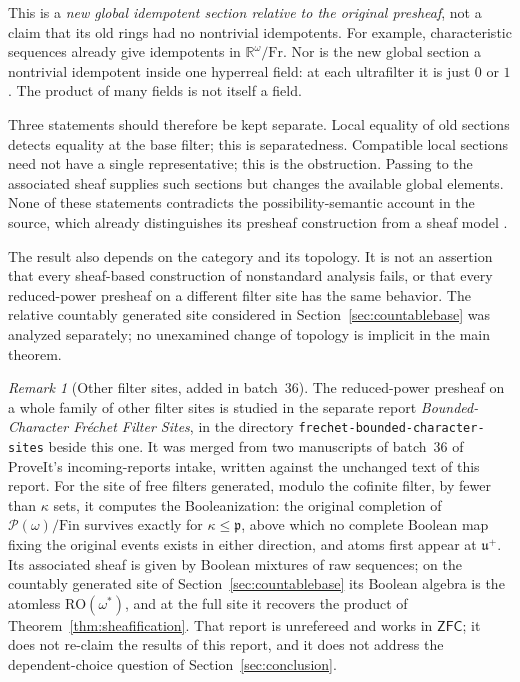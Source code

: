 \documentclass[11pt,letterpaper]{article}
\theoremstyle{definition}
\theoremstyle{remark}
\newtheorem{remark}[theorem]{Remark}
\newcommand{\om}{\omega}
\newcommand{\Fr}{\mathrm{Fr}}
\newcommand{\Pow}{\mathcal P}
\newcommand{\ZFC}{\mathsf{ZFC}}
\begin{document}
This is a \emph{new global idempotent section relative to the original
presheaf}, not a claim that its old rings had no nontrivial idempotents.
For example, characteristic sequences already give idempotents in
$\mathbb R^\om/\Fr$. Nor is the new global section a nontrivial
idempotent inside one hyperreal field: at each ultrafilter it is just
$0$ or $1$. The product of many fields is not itself a field.

Three statements should therefore be kept separate. Local equality of
old sections detects equality at the base filter; this is separatedness.
Compatible local sections need not have a single representative; this
is the obstruction. Passing to the associated sheaf supplies such
sections but changes the available global elements. None of these
statements contradicts the possibility-semantic account in the source,
which already distinguishes its presheaf construction from a sheaf
model \cite[Section 5.2]{Massas2023}.

The result also depends on the category and its topology. It is not an
assertion that every sheaf-based construction of nonstandard analysis
fails, or that every reduced-power presheaf on a different filter site
has the same behavior. The relative countably generated site considered
in Section~\ref{sec:countablebase} was analyzed separately; no
unexamined change of topology is implicit in the main theorem.

\begin{remark}[Other filter sites, added in batch~36]
\label{fto:rem:bounded-character-sites}
The reduced-power presheaf on a whole family of other filter sites is
studied in the separate report \emph{Bounded-Character Fr\'echet Filter
Sites}, in the directory \texttt{frechet-bounded-character-sites} beside
this one. It was merged from two manuscripts of batch~36 of ProveIt's
incoming-reports intake, written against the unchanged text of this
report. For the site of free filters generated, modulo the cofinite
filter, by fewer than $\kappa$ sets, it computes the Booleanization: the
original completion of $\Pow(\om)/\mathrm{Fin}$ survives exactly for
$\kappa\leq\mathfrak p$, above which no complete Boolean map fixing the
original events exists in either direction, and atoms first appear at
$\mathfrak u^+$. Its associated sheaf is given by Boolean mixtures of raw
sequences; on the countably generated site of
Section~\ref{sec:countablebase} its Boolean algebra is the atomless
$\mathrm{RO}(\om^*)$, and at the full site it recovers the product of
Theorem~\ref{thm:sheafification}. That report is unrefereed and works in
$\ZFC$; it does not re-claim the results of this report, and it does not
address the dependent-choice question of Section~\ref{sec:conclusion}.
\end{remark}
\end{document}
